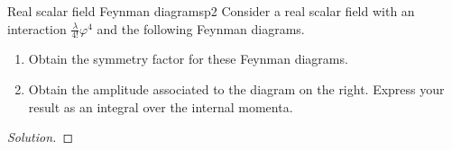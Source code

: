 \begin{problem}{Real scalar field Feynman diagrams}{p2}
   Consider a real scalar field with an interaction \(\frac{\lambda}{4!} \varphi^4\) and the following Feynman diagrams.
   \begin{enumerate}[label=(\alph*)]
       \item Obtain the symmetry factor for these Feynman diagrams.
       \item Obtain the amplitude associated to the diagram on the right. Express your result as an integral over the internal momenta.
   \end{enumerate}
\end{problem}
\begin{proof}[Solution]
    
\end{proof}
